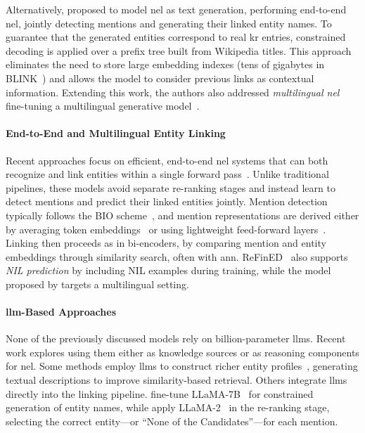 Alternatively, \textcite{decao2021autoregressive} proposed to model \ac{nel} as text generation, performing end-to-end \ac{nel}, jointly detecting mentions and generating their linked entity names. To guarantee that the generated entities correspond to real \ac{kr} entries, constrained decoding is applied over a prefix tree built from Wikipedia titles. This approach eliminates the need to store large embedding indexes (tens of gigabytes in BLINK~\cite{blink}) and allows the model to consider previous links as contextual information.
Extending this work, the authors also addressed \emph{multilingual \acl{nel}} fine-tuning a multilingual generative model~\cite{de-cao-etal-2022-multilingual}.



\paragraph{End-to-End and Multilingual Entity Linking}

Recent approaches focus on efficient, end-to-end \ac{nel} systems that can both recognize and link entities within a single forward pass~\cite{ayoola-etal-2022-refined,plekhanov2023multilingualendendentity}. 
Unlike traditional pipelines, these models avoid separate re-ranking stages and instead learn to detect mentions and predict their linked entities jointly. 
Mention detection typically follows the BIO scheme~\cite{ramshaw-marcus-1995-text-bio-scheme}, and mention representations are derived either by averaging token embeddings~\cite{ayoola-etal-2022-refined} or using lightweight feed-forward layers~\cite{plekhanov2023multilingualendendentity}. 
Linking then proceeds as in bi-encoders, by comparing mention and entity embeddings through similarity search, often with \acf{ann}.  
ReFinED~\cite{ayoola-etal-2022-refined} also supports \emph{NIL prediction} by including NIL examples during training, while the model proposed by \textcite{plekhanov2023multilingualendendentity} targets a multilingual setting.

\paragraph{\acs{llm}-Based Approaches}

None of the previously discussed models rely on billion-parameter \acp{llm}. 
Recent work explores using them either as knowledge sources or as reasoning components for \ac{nel}.  
Some methods employ \acp{llm} to construct richer entity profiles~\cite{RYNKIEWICZ2025112185}, generating textual descriptions to improve similarity-based retrieval.  
Others integrate \acp{llm} directly into the linking pipeline.  
\textcite{xiao-etal-2023-instructed} fine-tune LLaMA-7B~\cite{touvron2023llamaopenefficientfoundation} for constrained generation of entity names, while \textcite{zhou-etal-2024-gendecider} apply LLaMA-2~\cite{touvron2023llama2openfoundation} in the re-ranking stage, selecting the correct entity---or ``None of the Candidates''---for each mention.  

